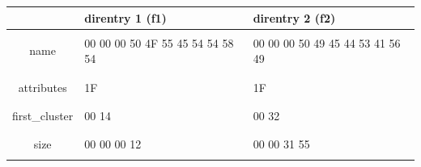 \documentclass[11pt,a4paper]{article}
\begin{document}
\begin{table}[ht!]
  \centering
  \begin{minipage}{0.3\textwidth}
    \centering
%


  \end{minipage}
  \hfillx
  \begin{minipage}{0.65\textwidth}
    \centering

\begin{tabular}{ | c | C{4cm} | C{4cm} | }
\hline
 & direntry 1 (f1) & direntry 2 (f2) \\
\hline
 & & \\
name &  00 00 00 50 4F 55 45 54 54 58 54  &  00 00 00 50 49 45 44 53 41 56 49  \\
 & & \\
\hline
 & & \\
attributes &  1F  &  1F  \\
 & & \\
\hline
 & & \\
first\_cluster &  00 14  &  00 32  \\
 & & \\
\hline
 & & \\
size &  00 00 00 12  &  00 00 31 55  \\
 & & \\
\hline
\end{tabular}

  \end{minipage}
\end{table}
\end{document}

